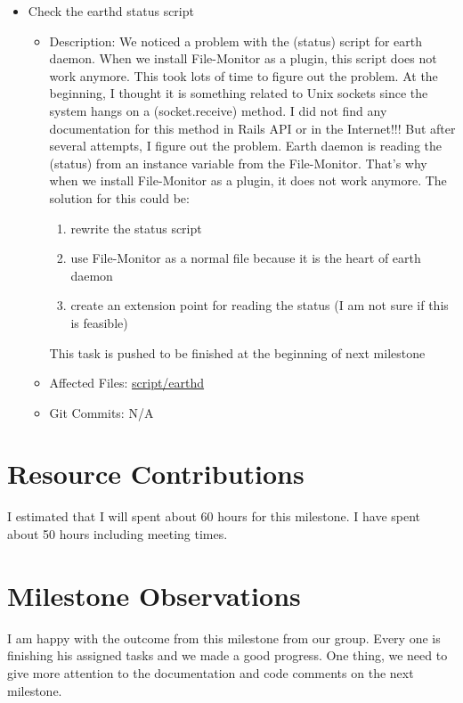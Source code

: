\documentclass{article}
\begin{document}
\begin{itemize}
\begin{itemize}
		\end{itemize}
	\item Check the earthd status script
		\begin{itemize}
		\item Description: We noticed a problem with the (status) script for earth daemon. When we install File-Monitor as a plugin, this script does not work anymore. This took lots of time to figure out the problem. At the beginning, I thought it is something related to Unix sockets since the system hangs on a (socket.receive) method. I did not find any documentation for this method in Rails API or in the Internet!!! But after several attempts, I figure out the problem. Earth daemon is reading the (status) from an instance variable from the File-Monitor. That's why when we install File-Monitor as a plugin, it does not work anymore. The solution for this could be: 
\begin{enumerate}
\item rewrite the status script
\item use File-Monitor as a normal file because it is the heart of earth daemon
\item create an extension point for reading the status (I am not sure if this is feasible)
\end{enumerate}
This task is pushed to be finished at the beginning of next milestone

		\item Affected Files: \href{http://github.com/mfbDev/earth/tree/master/script/earthd}{script/earthd}
		\item Git Commits: N/A
		
		\end{itemize}

\end{itemize}
\newpage
\section*{Resource Contributions}
I estimated that I will spent about 60 hours for this milestone. I have spent about 50 hours including meeting times. 


\section*{Milestone Observations}
I am happy with the outcome from this milestone from our group. Every one is finishing his assigned tasks and we made a good progress. One thing, we need to give more attention to the documentation and code comments on the next milestone.
\end{document}
